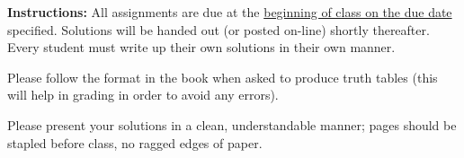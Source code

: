 \documentclass[12pt,addpoints]{exam}
\begin{document}
\extrawidth{0.5in} \extrafootheight{-0.75in} \pagestyle{headandfoot}
\headrule {} \footrule {}

\noindent \textbf{Instructions:} All assignments are due at the
\underline{beginning of class on the due date} specified.  Solutions will be
handed out (or posted on-line) shortly thereafter.  Every student
must write up their own solutions in their own manner.

\noindent Please follow the format in the book when asked to produce
truth tables (this will help in grading in order to avoid any
errors).

\noindent Please present your solutions in a clean, understandable
manner; pages should be stapled before class, no ragged edges of
paper.

\end{document}
